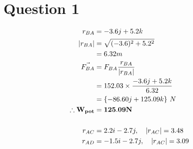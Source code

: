 \documentclass{article}
\begin{document}
\newcommand{\documentcourse}{ENGG1300}
\newcommand{\documentnumber}{1}





\section*{Question 1}
\begin{align*}
    r_{BA}                                                                                                 & = -3.6j + 5.2k                                 \\
    |r_{BA}|                                                                                               & = \sqrt{(-3.6)^2 + 5.2^2}                      \\
                                                                                                           & = 6.32 m                                       \\
    \vec{F_{BA}}                                                                                           & = F_{BA} \frac{r_{BA}}{|r_{BA}|}               \\
                                                                                                           & = 152.03 \times \frac{-3.6j+5.2k}{6.32}        \\
                                                                                                           & = \{-86.60j + 125.09k\}\  N                    \\
    \mathbf{\therefore W_{pot}}                                                                            & = \mathbf{125.09 N}                            \\ \hrulefill \\
    r_{AC}                                                                                                 & = 2.2i -2.7j,\quad|r_{AC}|=3.48                \\
    r_{AD}                                                                                                 & = -1.5i -2.7j,\quad|r_{AC}|=3.09               \\ \hrulefill \\

\end{align*}
\end{document}

